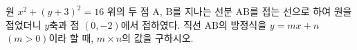 원 $x^2 + (y+3)^2 = 16$ 위의 두 점 $\mathrm{A}$, $\mathrm{B}$를 지나는 선분 $\mathrm{AB}$를 접는 선으로 하여 원을 접었더니 $y$축과 점 $(0, -2)$에서 접하였다.
직선 $\mathrm{AB}$의 방정식을 $y = mx + n$ $(m > 0)$이라 할 때, $m \times n$의 값을 구하시오.

